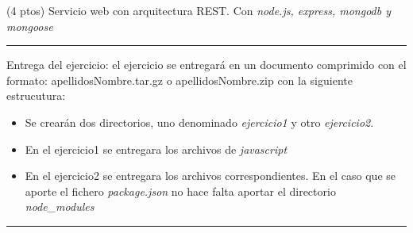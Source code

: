 \documentclass[addpoints,12pt]{exam}
\begin{document}
\begin{questions}
\newpage

\question(4 ptos) Servicio web con arquitectura REST. Con \emph{node.js, express, mongodb y mongoose}
\end{questions}
\vspace{0,5cm}
\hrule
\vspace{0,5cm}
Entrega del ejercicio: el ejercicio se entregará en un documento comprimido con el formato: apellidosNombre.tar.gz o apellidosNombre.zip con la siguiente estrucutura:
\begin{itemize}
\item Se crearán dos directorios, uno denominado \emph{ejercicio1} y otro \emph{ejercicio2}.
\item En el ejercicio1 se entregara los archivos de \emph{javascript}
\item En el ejercicio2 se entregara los archivos correspondientes. En el caso que se aporte el fichero \emph{package.json} no hace falta aportar el directorio \emph{node\_modules}
\end{itemize}
\vspace{0,5cm}
\hrule
\end{document}
